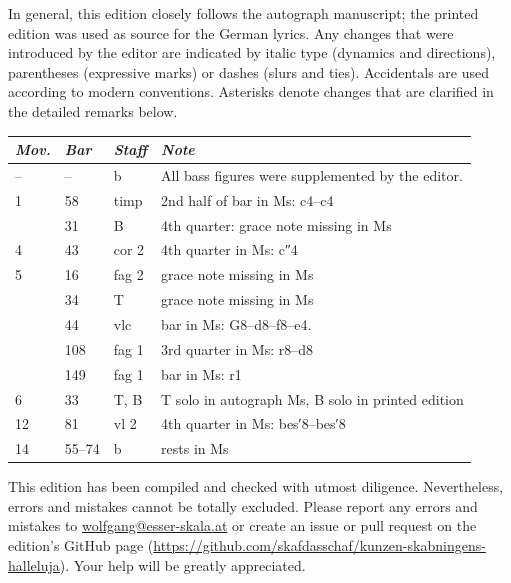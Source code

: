 \documentclass[parskip=full]{scrreprt}
\begin{document}
In general, this edition closely follows the autograph manuscript; the printed edition was used as source for the German lyrics. Any changes that were introduced by the editor are indicated by italic type (dynamics and directions), parentheses (expressive marks) or dashes (slurs and ties). Accidentals are used according to modern conventions. Asterisks denote changes that are clarified in the detailed remarks below.

\bigskip


\begin{longtable}{lll L{10cm}}
	\toprule
	\itshape Mov. & \itshape Bar & \itshape Staff & \itshape Note \\
	\midrule \endhead
	–  & –     & b     & All bass figures were supplemented by the editor. \\
	1  & 58    & timp  & 2nd half of bar in Ms: c4–c4 \\
	   & 31    & B     & 4th quarter: grace note missing in Ms \\
	4  & 43    & cor 2 & 4th quarter in Ms: c″4 \\
	5  & 16    & fag 2 & grace note missing in Ms \\
	   & 34    & T     & grace note missing in Ms \\
	   & 44    & vlc   & bar in Ms: G8–d8–f8–e4. \\
	   & 108   & fag 1 & 3rd quarter in Ms: r8–d8 \\
	   & 149   & fag 1 & bar in Ms: r1 \\
	6  & 33    & T, B  & T solo in autograph Ms, B solo in printed edition \\
	12 & 81    & vl 2  & 4th quarter in Ms: bes′8–bes′8 \\
	14 & 55–74 & b     & rests in Ms \\
	\bottomrule
\end{longtable}


This edition has been compiled and checked with utmost diligence. Nevertheless, errors and mistakes cannot be totally excluded. Please report any errors and mistakes to \url{wolfgang@esser-skala.at} or create an issue or pull request on the edition’s GitHub page (\url{https://github.com/skafdasschaf/kunzen-skabningens-halleluja}). Your help will be greatly appreciated.
\end{document}
